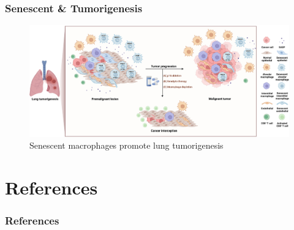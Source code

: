 \documentclass{beamer}
\begin{document}
        \begin{frame}
            \frametitle{Senescent \& Tumorigenesis}

            \begin{figure}
                \includegraphics[width=0.9 \linewidth]{figures/LungCancer/senescent.jpg}
                \caption{Senescent macrophages promote lung tumorigenesis \protect\cite{senescent-01}}
            \end{figure}
        \end{frame}

    \section{References}
    \begin{frame}[allowframebreaks]
        \frametitle{References}
        
        
    \end{frame}
\end{document}
